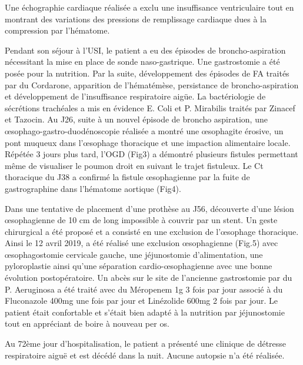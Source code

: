 \documentclass[./tfe]{subfiles}
\begin{document}
Une échographie cardiaque réalisée a exclu une insuffisance ventriculaire tout en montrant des variations des pressions de remplissage cardiaque dues à la compression par l'hématome.

Pendant son séjour à l’USI, le patient a eu des épisodes de broncho-aspiration nécessitant la mise en place de sonde naso-gastrique. Une gastrostomie a été posée pour la nutrition. Par la suite, développement des épisodes de FA traités par du Cordarone, apparition de l’hématémèse, persistance de broncho-aspiration et développement de l’insuffisance respiratoire aigüe. La bactériologie de sécrétions trachéales a mis en évidence E. Coli et P. Mirabilis traités par Zinacef et Tazocin. Au J26, suite à un nouvel épisode de broncho aspiration, une œsophago-gastro-duodénoscopie réalisée a montré une œsophagite érosive, un pont muqueux dans l'œsophage thoracique et une impaction alimentaire locale. Répétée 3 jours plus tard, l’OGD (Fig3) a démontré plusieurs fistules permettant même de visualiser le poumon droit en suivant le trajet fistuleux. Le Ct thoracique du J38 a confirmé la fistule œsophagienne par la fuite de gastrographine dans l’hématome aortique (Fig4).

Dans une tentative de placement d’une prothèse au J56, découverte d’une lésion œsophagienne de 10 cm de long impossible à couvrir par un stent. Un geste chirurgical a été proposé et a consisté en une exclusion de l'œsophage thoracique. Ainsi le 12 avril 2019, a été réalisé une exclusion œsophagienne (Fig.5) avec œsophagostomie cervicale gauche, une jéjunostomie d’alimentation, une pyloroplastie ainsi qu’une séparation cardio-œsophagienne avec une bonne évolution postopératoire. Un abcès sur le site de l’ancienne gastrostomie par du P. Aeruginosa a été traité avec du Méropenem 1g  3 fois par jour associé à du Fluconazole 400mg une fois par jour et Linézolide 600mg 2 fois par jour. Le patient était confortable et s’était bien adapté à la nutrition par jéjunostomie tout en appréciant de boire à nouveau per os.

Au 72ème jour d’hospitalisation, le patient a présenté une clinique de détresse respiratoire aiguë et est décédé dans la nuit. Aucune autopsie n'a été réalisée.
\end{document}
